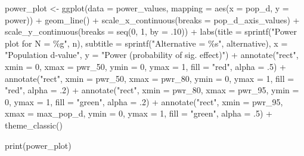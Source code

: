 \documentclass[
]{krantz}
\makeatletter
\newenvironment{Shaded}{\begin{snugshade}}{\end{snugshade}}
\newcommand{\AttributeTok}[1]{\textcolor[rgb]{0.61,0.61,0.61}{#1}}
\newcommand{\DecValTok}[1]{\textcolor[rgb]{0.06,0.06,0.06}{#1}}
\newcommand{\FunctionTok}[1]{\textcolor[rgb]{0,0,0}{#1}}
\newcommand{\NormalTok}[1]{#1}
\newcommand{\OtherTok}[1]{\textcolor[rgb]{0.37,0.37,0.37}{#1}}
\newcommand{\SpecialCharTok}[1]{\textcolor[rgb]{0,0,0}{#1}}
\newcommand{\StringTok}[1]{\textcolor[rgb]{0.5,0.5,0.5}{#1}}
\newenvironment{kframe}{%
\medskip{}
\setlength{\fboxsep}{.8em}
 \def\at@end@of@kframe{}%
 \ifinner\ifhmode%
  \def\at@end@of@kframe{\end{minipage}}%
  \begin{minipage}{\columnwidth}%
 \fi\fi%
 \def\FrameCommand##1{\hskip\@totalleftmargin \hskip-\fboxsep
 \colorbox{shadecolor}{##1}\hskip-\fboxsep
     \hskip-\linewidth \hskip-\@totalleftmargin \hskip\columnwidth}%
 \MakeFramed {\advance\hsize-\width
   \@totalleftmargin\z@ \linewidth\hsize
   \@setminipage}}%
 {\par\unskip\endMakeFramed%
 \at@end@of@kframe}
\renewenvironment{Shaded}{\begin{kframe}}{\end{kframe}}
\makeatother
\begin{document}
\begin{Shaded}
\begin{Highlighting}[]
\NormalTok{power\_plot }\OtherTok{\textless{}{-}} \FunctionTok{ggplot}\NormalTok{(}\AttributeTok{data =}\NormalTok{ power\_values,}
                     \AttributeTok{mapping =} \FunctionTok{aes}\NormalTok{(}\AttributeTok{x =}\NormalTok{ pop\_d, }\AttributeTok{y =}\NormalTok{ power)) }\SpecialCharTok{+}
  \FunctionTok{geom\_line}\NormalTok{() }\SpecialCharTok{+}
  \FunctionTok{scale\_x\_continuous}\NormalTok{(}\AttributeTok{breaks =}\NormalTok{ pop\_d\_axis\_values) }\SpecialCharTok{+}
  \FunctionTok{scale\_y\_continuous}\NormalTok{(}\AttributeTok{breaks =} \FunctionTok{seq}\NormalTok{(}\DecValTok{0}\NormalTok{, }\DecValTok{1}\NormalTok{, }\AttributeTok{by =}\NormalTok{ .}\DecValTok{10}\NormalTok{)) }\SpecialCharTok{+}
  \FunctionTok{labs}\NormalTok{(}\AttributeTok{title =} \FunctionTok{sprintf}\NormalTok{(}\StringTok{"Power plot for N = \%g"}\NormalTok{, n),}
       \AttributeTok{subtitle =} \FunctionTok{sprintf}\NormalTok{(}\StringTok{"Alternative = \%s"}\NormalTok{, alternative),}
       \AttributeTok{x =} \StringTok{"Population d{-}value"}\NormalTok{,}
       \AttributeTok{y =} \StringTok{"Power (probability of sig. effect)"}\NormalTok{) }\SpecialCharTok{+}
  \FunctionTok{annotate}\NormalTok{(}\StringTok{"rect"}\NormalTok{, }\AttributeTok{xmin =} \DecValTok{0}\NormalTok{, }\AttributeTok{xmax =}\NormalTok{ pwr\_50, }
           \AttributeTok{ymin =} \DecValTok{0}\NormalTok{, }\AttributeTok{ymax =} \DecValTok{1}\NormalTok{, }
           \AttributeTok{fill =} \StringTok{"red"}\NormalTok{, }\AttributeTok{alpha =}\NormalTok{ .}\DecValTok{5}\NormalTok{) }\SpecialCharTok{+}
  \FunctionTok{annotate}\NormalTok{(}\StringTok{"rect"}\NormalTok{, }\AttributeTok{xmin =}\NormalTok{ pwr\_50, }\AttributeTok{xmax =}\NormalTok{ pwr\_80, }
           \AttributeTok{ymin =} \DecValTok{0}\NormalTok{, }\AttributeTok{ymax =} \DecValTok{1}\NormalTok{, }
           \AttributeTok{fill =} \StringTok{"red"}\NormalTok{, }\AttributeTok{alpha =}\NormalTok{ .}\DecValTok{2}\NormalTok{) }\SpecialCharTok{+}
  \FunctionTok{annotate}\NormalTok{(}\StringTok{"rect"}\NormalTok{, }\AttributeTok{xmin =}\NormalTok{ pwr\_80, }\AttributeTok{xmax =}\NormalTok{ pwr\_95, }
           \AttributeTok{ymin =} \DecValTok{0}\NormalTok{, }\AttributeTok{ymax =} \DecValTok{1}\NormalTok{, }
           \AttributeTok{fill =} \StringTok{"green"}\NormalTok{, }\AttributeTok{alpha =}\NormalTok{ .}\DecValTok{2}\NormalTok{) }\SpecialCharTok{+}
  \FunctionTok{annotate}\NormalTok{(}\StringTok{"rect"}\NormalTok{, }\AttributeTok{xmin =}\NormalTok{ pwr\_95, }\AttributeTok{xmax =}\NormalTok{ max\_pop\_d, }
           \AttributeTok{ymin =} \DecValTok{0}\NormalTok{, }\AttributeTok{ymax =} \DecValTok{1}\NormalTok{, }
           \AttributeTok{fill =} \StringTok{"green"}\NormalTok{, }\AttributeTok{alpha =}\NormalTok{ .}\DecValTok{5}\NormalTok{) }\SpecialCharTok{+}
  \FunctionTok{theme\_classic}\NormalTok{()}

\FunctionTok{print}\NormalTok{(power\_plot)}
\end{Highlighting}
\end{Shaded}
\end{document}
